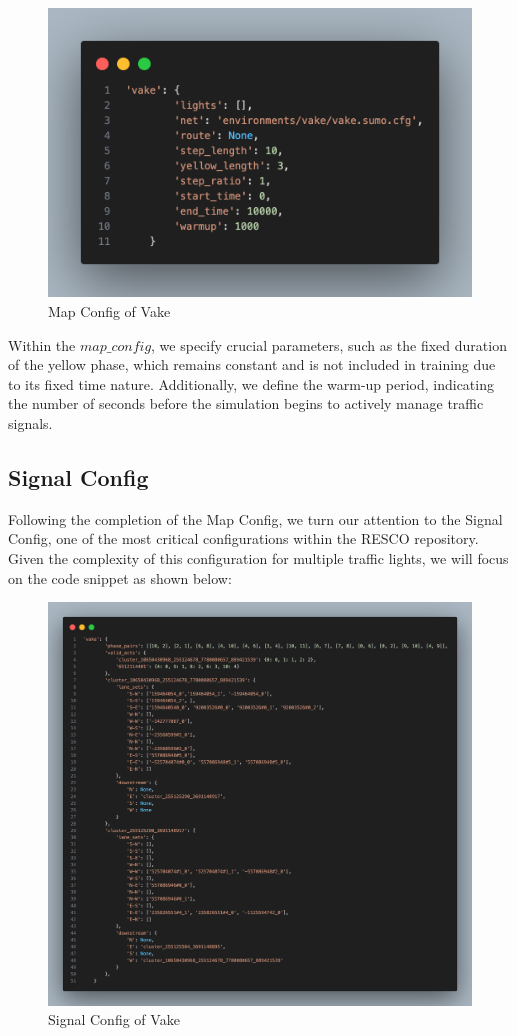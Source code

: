 \begin{figure}[h]
    \centering
    \includegraphics[width=0.8\linewidth]{images/methodology/map-config-vake.png}
    \caption{Map Config of Vake}
    \label{fig:map-config-vake}
\end{figure}

Within the $map\_config$, we specify crucial parameters, such as the fixed duration of the yellow phase, which remains constant and is not included in training due to its fixed time nature. Additionally, we define the warm-up period, indicating the number of seconds before the simulation begins to actively manage traffic signals.

\subsection{Signal Config}
Following the completion of the Map Config, we turn our attention to the Signal Config, one of the most critical configurations within the RESCO repository. Given the complexity of this configuration for multiple traffic lights, we will focus on the code snippet as shown below:

\begin{figure}[h]
    \centering
    \includegraphics[width=1\linewidth]{images/methodology/signal-config-vake.png}
    \caption{Signal Config of Vake}
    \label{fig:signal-config-vake}
\end{figure}

